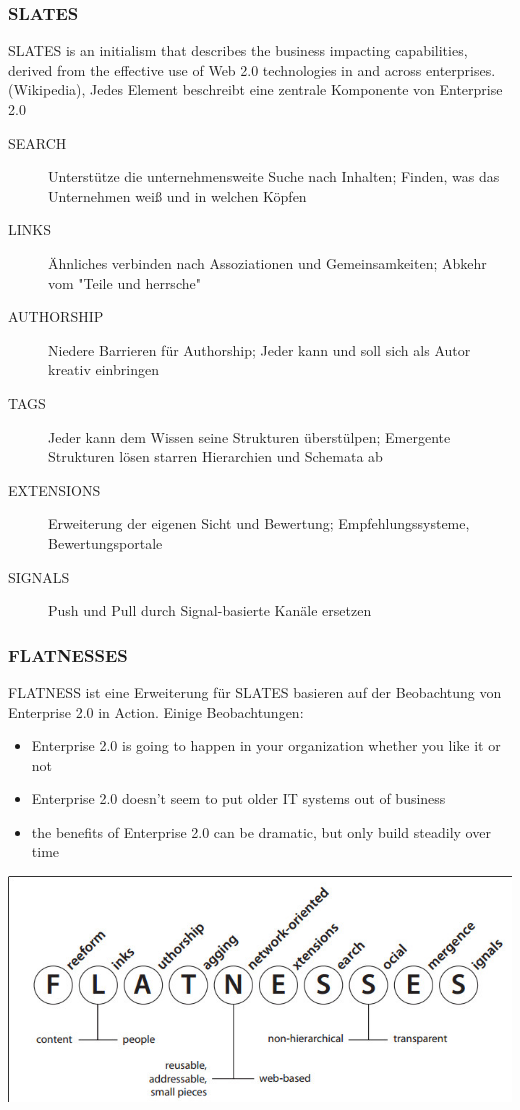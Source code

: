 \documentclass{article} %
\begin{document}
	\subsubsection{SLATES}
	\glqq SLATES is an initialism that describes the business impacting capabilities, derived from the effective use of Web 2.0 technologies in and across enterprises.\grqq (Wikipedia), Jedes Element beschreibt eine zentrale Komponente von Enterprise 2.0
	\begin{description}
		\item[SEARCH] Unterstütze die unternehmensweite Suche nach Inhalten;
		Finden, was das Unternehmen weiß und in welchen Köpfen
		\item[LINKS] Ähnliches verbinden nach Assoziationen und Gemeinsamkeiten;
		Abkehr vom  "Teile und herrsche"
		\item[AUTHORSHIP] Niedere Barrieren für Authorship;
		Jeder kann und soll sich als Autor kreativ einbringen
		\item[TAGS] Jeder kann dem Wissen seine Strukturen überstülpen;
		Emergente Strukturen lösen starren Hierarchien und Schemata ab
		\item[EXTENSIONS] Erweiterung der eigenen Sicht und Bewertung;
		Empfehlungssysteme, Bewertungsportale
		\item[SIGNALS] Push und Pull durch Signal-basierte Kanäle ersetzen
	\end{description}
	\subsubsection{FLATNESSES}
	FLATNESS ist eine Erweiterung für SLATES basieren auf der Beobachtung von Enterprise 2.0 in Action. Einige Beobachtungen:
	\begin{itemize}
		\item Enterprise 2.0 is going to happen in your organization whether you
		like it or not
		\item Enterprise 2.0 doesn’t seem to put older IT systems out of business
		\item the benefits of Enterprise 2.0 can be dramatic, but only build steadily
		over time
	\end{itemize}
	\begin{center}
		\includegraphics[scale=0.5]{img/FLATNESS.jpg}
	\end{center}
\end{document}
